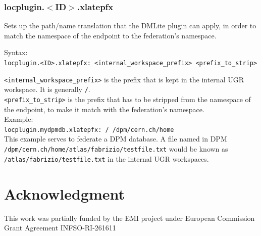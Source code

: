 \documentclass[12pt]{article} %
\begin{document}
\subsubsection{locplugin.$<$ID$>$.xlatepfx}
Sets up the path/name translation that the DMLite plugin can apply, in order to match the namespace of the endpoint to the federation's namespace.

Syntax:\\
\verb"locplugin.<ID>.xlatepfx: <internal_workspace_prefix> <prefix_to_strip>"

\verb"<internal_workspace_prefix>" is the prefix that is kept in the internal UGR workspace. It is generally \verb"/".\\
\verb"<prefix_to_strip>" is the prefix that has to be stripped from the namespace of the endpoint, to make it match with the federation's namespace.\\

Example:\\

\verb"locplugin.mydpmdb.xlatepfx: / /dpm/cern.ch/home"\\

This example serves to federate a DPM database. A file named in DPM \verb"/dpm/cern.ch/home/atlas/fabrizio/testfile.txt" would be known as \\
\verb"/atlas/fabrizio/testfile.txt" in the internal UGR workspaces.

\section*{Acknowledgment}

This work was partially funded by the EMI project under European
Commission Grant Agreement INFSO-RI-261611
\end{document}
